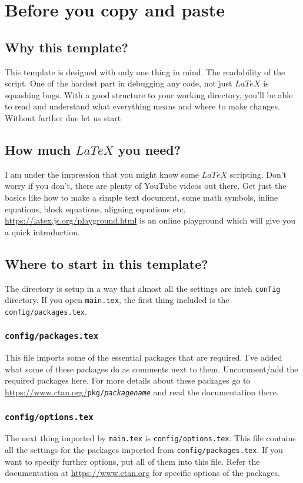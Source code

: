 \chapter{Before you copy and paste}

  \section{Why this template?}
  \label{sec:start}
  This template is designed with only one thing in mind. The readability of the script. One of the hardest part in debugging any code, not just $LaTeX$ is squashing bugs. With a good structure to your working directory, you'll be able to read and understand what everything means and where to make changes. Without further due let us start

  \section{How much $LaTeX$ you need?}
  I am under the impression that you might know some $LaTeX$ scripting. Don't worry if you don't, there are plenty of YouTube videos out there. Get just the basics like how to make a simple text document, some math symbols, inline equations, block equations, aligning equations etc. \url{https://latex.js.org/playground.html} is an online playground which will give you a quick introduction.

  \section{Where to start in this template?}
  The directory is setup in a way that almost all the settings are inteh \texttt{config} directory. If you open \texttt{main.tex}, the first thing included is the \texttt{config/packages.tex}. 
  \subsection{\texttt{config/packages.tex}}
  This file imports some of the essential packages that are required. I've added what some of these packages do as comments next to them. Uncomment/add the required packages here. For more details about these packages go to \url{https://www.ctan.org/}\texttt{pkg/\textit{packagename}} and read the documentation there.
  
  \subsection{\texttt{config/options.tex}}
  The next thing imported by \texttt{main.tex} is \texttt{config/options.tex}. This file contains all the settings for the packages imported from \texttt{config/packages.tex}. If you want to specify further options, put all of them into this file. Refer the documentation at \url{https://www.ctan.org} for specific options of the packages.

